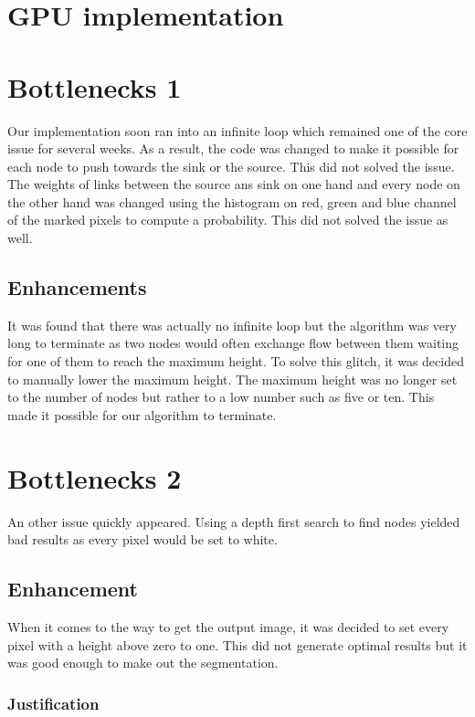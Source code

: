\documentclass{article}
\begin{document}
\section{GPU implementation}

\section{Bottlenecks 1}

Our implementation soon ran into an infinite loop which remained one of the core issue for several weeks. As a result, the code was changed to make it possible for each node to push towards the sink or the source. This did not solved the issue. The weights of links between the source ans sink on one hand and every node on the other hand was changed using the histogram on red, green and blue channel of the marked pixels to compute a probability. This did not solved the issue as well.

\subsection{Enhancements}

It was found that there was actually no infinite loop but the algorithm was very long to terminate as two nodes would often exchange flow between them waiting for one of them to reach the maximum height. To solve this glitch, it was decided to manually lower the maximum height. The maximum height was no longer set to the number of nodes but rather to a low number such as five or ten. This made it possible for our algorithm to terminate.

\section{Bottlenecks 2}

An other issue quickly appeared. Using a depth first search to find nodes yielded bad results as every pixel would be set to white.

\subsection{Enhancement}

When it comes to the way to get the output image, it was decided to set every pixel with a height above zero to one. This did not generate optimal results but it was good enough to make out the segmentation.

\subsubsection{Justification}
\end{document}

